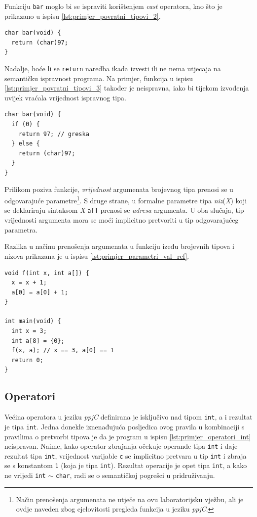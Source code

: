 \documentclass[times, 12pt, utf8]{book}
\begin{document}
Funkciju \verb|bar| moglo bi se ispraviti korištenjem \emph{cast} operatora, kao što je prikazano u ispisu \ref{lst:primjer_povratni_tipovi_2}.

\begin{lstlisting}[caption={Ispravljena funkcija \texttt{bar}.},label=lst:primjer_povratni_tipovi_2]
char bar(void) {
  return (char)97;
}
\end{lstlisting}

Nadalje, hoće li se \verb|return| naredba ikada izvesti ili ne nema utjecaja na semantičku ispravnost programa.
Na primjer, funkcija u ispisu \ref{lst:primjer_povratni_tipovi_3} također je neispravna, iako bi tijekom izvođenja uvijek vraćala vrijednost ispravnog tipa.

\begin{lstlisting}[caption={Ispravnost tipova povratnih vrijednosti ne ovisi o tome hoće li se određena \texttt{return} naredba ikada izvršiti ili ne.},label=lst:primjer_povratni_tipovi_3]
char bar(void) {
  if (0) {
    return 97; // greska
  } else {
    return (char)97;
  }
}
\end{lstlisting}

Prilikom poziva funkcije, \emph{vrijednost} argumenata brojevnog tipa prenosi se u odgovarajuće parametre\footnote{Način prenošenja argumenata ne utječe na ovu laboratorijsku vježbu, ali je ovdje naveden zbog cjelovitosti pregleda funkcija u jeziku \emph{ppjC}.}.
S druge strane, u formalne parametre tipa \emph{niz}(\emph{X}) koji se deklariraju sintaksom \emph{X} \verb|a[]| prenosi se \emph{adresa} argumenta.
U oba slučaja, tip vrijednosti argumenta mora se moći implicitno pretvoriti u tip odgovarajućeg parametra.

Razlika u načinu prenošenja argumenata u funkciju izeđu brojevnih tipova i nizova prikazana je u ispisu \ref{lst:primjer_parametri_val_ref}.

\begin{lstlisting}[caption={Brojevni tipovi se prenose \emph{razmjenom vrijednosti}. Nizovi se prenose \emph{razmjenom adresa}.},label=lst:primjer_parametri_val_ref]
void f(int x, int a[]) {
  x = x + 1;
  a[0] = a[0] + 1;
}

int main(void) {
  int x = 3;
  int a[8] = {0};
  f(x, a); // x == 3, a[0] == 1
  return 0;
}
\end{lstlisting}

\subsection{Operatori}
Većina operatora u jeziku \emph{ppjC} definirana je isključivo nad tipom \verb|int|, a i rezultat je tipa \verb|int|.
Jedna donekle iznenađujuća posljedica ovog pravila u kombinaciji s pravilima o pretvorbi tipova je da je program u ispisu \ref{lst:primjer_operatori_int} neispravan.
Naime, kako operator zbrajanja očekuje operande tipa \verb|int| i daje rezultat tipa \verb|int|, vrijednost varijable \verb|c| se implicitno pretvara u tip \verb|int| i zbraja se s konstantom \verb|1| (koja je tipa \verb|int|).
Rezultat operacije je opet tipa \verb|int|, a kako ne vrijedi \verb|int| \(\sim\) \verb|char|, radi se o semantičkoj pogrešci u pridruživanju.
\end{document}
